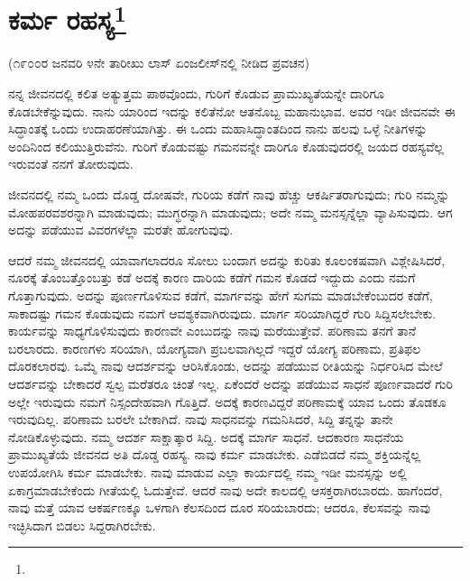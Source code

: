 
\chapter{ಕರ್ಮ ರಹಸ್ಯ\protect\footnote{}}

\begin{center}
(೧೯೦೦ರ ಜನವರಿ ೪ನೇ ತಾರೀಖು ಲಾಸ್ ಏಂಜಲೀಸ್‌ನಲ್ಲಿ ನೀಡಿದ ಪ್ರವಚನ)
\end{center}

ನನ್ನ ಜೀವನದಲ್ಲಿ ಕಲಿತ ಅತ್ಯುತ್ತಮ ಪಾಠವೊಂದು, ಗುರಿಗೆ ಕೊಡುವ ಪ್ರಾಮುಖ್ಯತೆಯನ್ನೇ ದಾರಿಗೂ ಕೊಡಬೇಕೆನ್ನುವುದು. ನಾನು ಯಾರಿಂದ ಇದನ್ನು ಕಲಿತೆನೋ ಆತನೊಬ್ಬ ಮಹಾನುಭಾವ. ಅವರ ಇಡೀ ಜೀವನವೇ ಈ ಸಿದ್ಧಾಂತಕ್ಕೆ ಒಂದು ಉದಾಹರಣೆಯಾಗಿತ್ತು. ಈ ಒಂದು ಮಹಾಸಿದ್ಧಾಂತದಿಂದ ನಾನು ಹಲವು ಒಳ್ಳೆ ನೀತಿಗಳನ್ನು ಅಂದಿನಿಂದ ಕಲಿಯುತ್ತಿರುವೆನು. ಗುರಿಗೆ ಕೊಡುವಷ್ಟು ಗಮನವನ್ನೇ ದಾರಿಗೂ ಕೊಡುವುದರಲ್ಲಿ ಜಯದ ರಹಸ್ಯವೆಲ್ಲ ಇರುವಂತೆ ನನಗೆ ತೋರುವುದು.

ಜೀವನದಲ್ಲಿ ನಮ್ಮ ಒಂದು ದೊಡ್ಡ ದೋಷವೇ, ಗುರಿಯ ಕಡೆಗೆ ನಾವು ಹೆಚ್ಚು ಆಕರ್ಷಿತರಾಗುವುದು; ಗುರಿ ನಮ್ಮನ್ನು ಮೋಹಪರವಶರನ್ನಾಗಿ ಮಾಡುವುದು; ಮುಗ್ಧರನ್ನಾಗಿ ಮಾಡುವುದು; ಅದೇ ನಮ್ಮ ಮನಸ್ಸನ್ನೆಲ್ಲಾ ವ್ಯಾಪಿಸುವುದು. ಆಗ ಅದನ್ನು ಪಡೆಯುವ ವಿವರಗಳೆಲ್ಲಾ ಮರತೇ ಹೋಗುವುವು.

ಆದರೆ ನಮ್ಮ ಜೀವನದಲ್ಲಿ ಯಾವಾಗಲಾದರೂ ಸೋಲು ಬಂದಾಗ ಅದನ್ನು ಕುರಿತು ಕೂಲಂಕಷವಾಗಿ ವಿಶ್ಲೇಷಿಸಿದರೆ, ನೂರಕ್ಕೆ ತೊಂಬತ್ತೊಂಬತ್ತು ಕಡೆ ಅದಕ್ಕೆ ಕಾರಣ ದಾರಿಯ ಕಡೆಗೆ ಗಮನ ಕೊಡದೆ ಇದ್ದುದು ಎಂದು ನಮಗೆ ಗೊತ್ತಾಗುವುದು. ಅದನ್ನು ಪೂರ್ಣಗೊಳಿಸುವ ಕಡೆಗೆ, ಮಾರ್ಗವನ್ನು ಹೇಗೆ ಸುಗಮ ಮಾಡಬೇಕೆಂಬುದರ ಕಡೆಗೆ, ಸಾಕಾದಷ್ಟು ಗಮನ ಕೊಡುವುದು ನಮಗೆ ಆವಶ್ಯಕವಾಗಿರುವುದು. ಮಾರ್ಗ ಸರಿಯಾಗಿದ್ದರೆ ಗುರಿ ಸಿದ್ದಿಸಲೇಬೇಕು. ಕಾರ್ಯವನ್ನು ಸಾಧ್ಯಗೊಳಿಸುವುದು ಕಾರಣವೇ ಎಂಬುದನ್ನು ನಾವು ಮರೆಯುತ್ತೇವೆ. ಪರಿಣಾಮ ತನಗೆ ತಾನೆ ಬರಲಾರದು. ಕಾರಣಗಳು ಸರಿಯಾಗಿ, ಯೋಗ್ಯವಾಗಿ ಪ್ರಬಲವಾಗಿಲ್ಲದೆ ಇದ್ದರೆ ಯೋಗ್ಯ ಪರಿಣಾಮ, ಪ್ರತಿಫಲ ದೊರಕಲಾರವು. ಒಮ್ಮೆ ನಾವು ಆದರ್ಶವನ್ನು ಆರಿಸಿಕೊಂಡು, ಅದನ್ನು ಪಡೆಯುವ ರೀತಿಯನ್ನು ನಿರ್ಧರಿಸಿದ ಮೇಲೆ ಆದರ್ಶವನ್ನು ಬೇಕಾದರೆ ಸ್ವಲ್ಪ ಮರೆತರೂ ಚಿಂತೆ ಇಲ್ಲ. ಏಕೆಂದರೆ ಅದನ್ನು ಪಡೆಯುವ ಸಾಧನೆ ಪೂರ್ಣವಾದರೆ ಗುರಿ ಅಲ್ಲೇ ಇರುವುದು ನಮಗೆ ನಿಸ್ಸಂದೇಹವಾಗಿ ಗೊತ್ತಿದೆ. ಅದಕ್ಕೆ ಕಾರಣವಿದ್ದರೆ ಪರಿಣಾಮಕ್ಕೆ ಯಾವ ಒಂದು ತೊಡಕೂ ಇರುವುದಿಲ್ಲ. ಪರಿಣಾಮ ಬರಲೇ ಬೇಕಾಗಿದೆ. ನಾವು ಸಾಧನವನ್ನು ಗಮನಿಸಿದರೆ, ಸಿದ್ದಿ ತನ್ನನ್ನು ತಾನೇ ನೋಡಿಕೊಳ್ಳುವುದು. ನಮ್ಮ ಆದರ್ಶ ಸಾಕ್ಷಾತ್ಕಾರ ಸಿದ್ದಿ. ಅದಕ್ಕೆ ಮಾರ್ಗ ಸಾಧನೆ. ಆದಕಾರಣ ಸಾಧನೆಯ ಪ್ರಾಮುಖ್ಯತೆಯೆ ಜೀವನದ ಅತಿ ದೊಡ್ಡ ರಹಸ್ಯ. ನಾವು ಕರ್ಮ ಮಾಡಬೇಕು. ಎಡೆಬಿಡದೆ ನಮ್ಮ ಶಕ್ತಿಯನ್ನೆಲ್ಲ ಉಪಯೋಗಿಸಿ ಕರ್ಮ ಮಾಡಬೇಕು. ನಾವು ಮಾಡುವ ಎಲ್ಲಾ ಕಾರ್ಯದಲ್ಲಿ ನಮ್ಮ ಇಡೀ ಮನಸ್ಸನ್ನು ಅಲ್ಲಿ ಏಕಾಗ್ರಮಾಡಬೇಕೆಂದು ಗೀತೆಯಲ್ಲಿ ಓದುತ್ತೇವೆ. ಆದರೆ ನಾವು ಅದೇ ಕಾಲದಲ್ಲಿ ಆಸಕ್ತರಾಗಿರಬಾರದು. ಹಾಗೆಂದರೆ, ನಾವು ಮತ್ತೆ ಯಾವ ಆಕರ್ಷಣಕ್ಕೂ ಒಳಗಾಗಿ ಕೆಲಸದಿಂದ ದೂರ ಸರಿಯಬಾರದು; ಆದರೂ, ಕೆಲಸವನ್ನು ನಾವು ಇಚ್ಛಿಸಿದಾಗ ಬಿಡಲು ಸಿದ್ದರಾಗಿರಬೇಕು.

